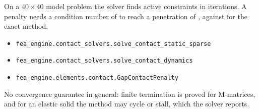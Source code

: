 \newpage\thispagestyle{hl}
\par
{}
\begin{hlheadline}On a $40\times40$ model problem the solver finds \ctcObsActive{} active constraints in \ctcObsIt{} iterations. A penalty needs a condition number of \ctcCondAtEight{} to reach a penetration of \ctcPenAtEight, against \ctcCondExact{} for the exact method.\end{hlheadline}
{\begin{itemize}\setlength\itemsep{2pt}
\item \texttt{fea\_engine.contact\_solvers.solve\_contact\_static\_sparse}
\item \texttt{fea\_engine.contact\_solvers.solve\_contact\_dynamics}
\item \texttt{fea\_engine.elements.contact.GapContactPenalty}
\end{itemize}}
\begin{hllimit}No convergence guarantee in general: finite termination is proved for M-matrices, and for an elastic solid the method may cycle or stall, which the solver reports.\end{hllimit}
